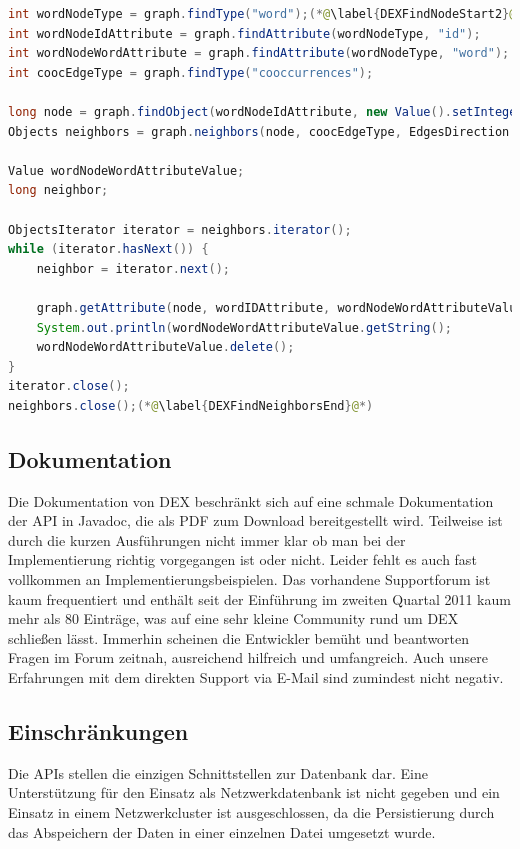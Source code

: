 \documentclass[11pt, a4paper, oneside]{article} %
\begin{document}
\begin{lstlisting}[caption={DEX - Daten abfragen - alle Nachbarn eines Knotens},label={lst:dex_select2},language=Java]
int wordNodeType = graph.findType("word");(*@\label{DEXFindNodeStart2}@*)
int wordNodeIdAttribute = graph.findAttribute(wordNodeType, "id");
int wordNodeWordAttribute = graph.findAttribute(wordNodeType, "word");
int coocEdgeType = graph.findType("cooccurrences");

long node = graph.findObject(wordNodeIdAttribute, new Value().setInteger("1"));(*@\label{DEXFindNodeEnd2}@*)
Objects neighbors = graph.neighbors(node, coocEdgeType, EdgesDirection.Outgoing);(*@\label{DEXFindNeighborsStart}@*)

Value wordNodeWordAttributeValue;
long neighbor;

ObjectsIterator iterator = neighbors.iterator();
while (iterator.hasNext()) {
	neighbor = iterator.next();

	graph.getAttribute(node, wordIDAttribute, wordNodeWordAttributeValue = new Value());
	System.out.println(wordNodeWordAttributeValue.getString();
	wordNodeWordAttributeValue.delete();
}
iterator.close();
neighbors.close();(*@\label{DEXFindNeighborsEnd}@*)
\end{lstlisting}

\subsection{Dokumentation}

Die Dokumentation von DEX beschränkt sich auf eine schmale Dokumentation der API in Javadoc, die als PDF zum Download bereitgestellt wird. Teilweise ist durch die kurzen Ausführungen nicht immer klar ob man bei der Implementierung richtig vorgegangen ist oder nicht. Leider fehlt es auch fast vollkommen an Implementierungsbeispielen. Das vorhandene Supportforum ist kaum frequentiert und enthält seit der Einführung im zweiten Quartal 2011 kaum mehr als 80 Einträge, was auf eine sehr kleine Community rund um DEX schließen lässt. Immerhin scheinen die Entwickler bemüht und beantworten Fragen im Forum zeitnah, ausreichend hilfreich und umfangreich. Auch unsere Erfahrungen mit dem direkten Support via E-Mail sind zumindest nicht negativ.

\subsection{Einschränkungen}

Die APIs stellen die einzigen Schnittstellen zur Datenbank dar. Eine Unterstützung für den Einsatz als Netzwerkdatenbank ist nicht gegeben und ein Einsatz in einem Netzwerkcluster ist ausgeschlossen, da die Persistierung durch das Abspeichern der Daten in einer einzelnen Datei umgesetzt wurde.
\end{document}
